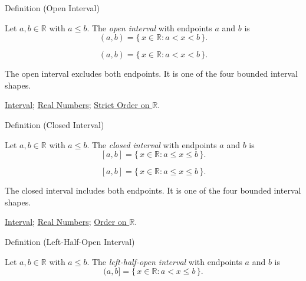 \begin{definitionbox}{Definition (Open Interval)}
\begin{definition}
\label{def:open-interval}
Let $a,b\in\mathbb{R}$ with $a\le b$. The \emph{open interval} with endpoints $a$ and $b$ is
\[
(a,b)=\{\,x\in\mathbb{R} : a<x<b\,\}.
\]
\end{definition}
\end{definitionbox}
\begin{remark*}
\[
(a,b)=\{\,x\in\mathbb{R} : a<x<b\,\}.
\]
\end{remark*}
\begin{remark*}[Interpretation]
The open interval excludes both endpoints. It is one of the four bounded interval shapes.
\end{remark*}
\begin{dependencies}
\hyperref[def:interval]{Interval};
\hyperref[def:reals]{Real Numbers};
\hyperref[def:strict-order-on-r]{Strict Order on $\mathbb{R}$}.
\end{dependencies}
\begin{definitionbox}{Definition (Closed Interval)}
\begin{definition}
\label{def:closed-interval}
Let $a,b\in\mathbb{R}$ with $a\le b$. The \emph{closed interval} with endpoints $a$ and $b$ is
\[
[a,b]=\{\,x\in\mathbb{R} : a\le x\le b\,\}.
\]
\end{definition}
\end{definitionbox}
\begin{remark*}
\[
[a,b]=\{\,x\in\mathbb{R} : a\le x\le b\,\}.
\]
\end{remark*}
\begin{remark*}[Interpretation]
The closed interval includes both endpoints. It is one of the four bounded interval shapes.
\end{remark*}
\begin{dependencies}
\hyperref[def:interval]{Interval};
\hyperref[def:reals]{Real Numbers};
\hyperref[def:order-on-r]{Order on $\mathbb{R}$}.
\end{dependencies}
\begin{definitionbox}{Definition (Left-Half-Open Interval)}
\begin{definition}
\label{def:left-half-open-interval}
Let $a,b\in\mathbb{R}$ with $a\le b$. The \emph{left-half-open interval} with endpoints $a$ and $b$ is
\[
(a,b]=\{\,x\in\mathbb{R} : a<x\le b\,\}.
\]
\end{definition}
\end{definitionbox}
